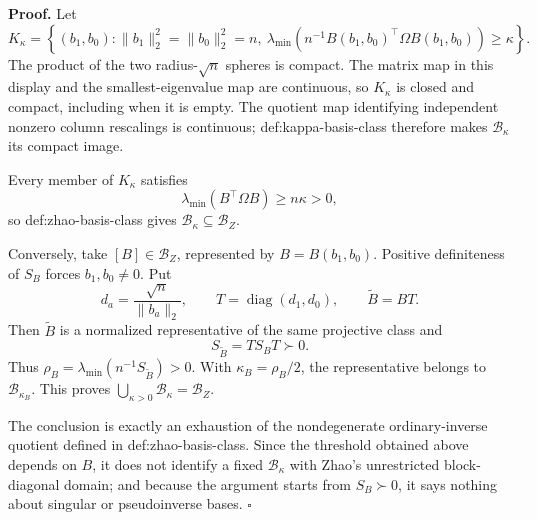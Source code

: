 \textbf{Proof.}
Let
\[
K_\kappa=\left\{(b_1,b_0):
\lVert b_1\rVert_2^2=\lVert b_0\rVert_2^2=n,
\ \lambda_{\min}\!\left(n^{-1}B(b_1,b_0)^{\top}\Omega B(b_1,b_0)\right)\ge\kappa
\right\}.
\]
The product of the two radius-\(\sqrt n\) spheres is compact.  The matrix map in this display and the smallest-eigenvalue map are continuous, so \(K_\kappa\) is closed and compact, including when it is empty.  The quotient map identifying independent nonzero column rescalings is continuous; def:kappa-basis-class therefore makes \(\mathcal B_\kappa\) its compact image.

Every member of \(K_\kappa\) satisfies
\[
\lambda_{\min}(B^{\top}\Omega B)\ge n\kappa>0,
\]
so def:zhao-basis-class gives \(\mathcal B_\kappa\subseteq\mathcal B_Z\).

Conversely, take \([B]\in\mathcal B_Z\), represented by \(B=B(b_1,b_0)\).  Positive definiteness of \(S_B\) forces \(b_1,b_0\ne0\).  Put
\[
d_a=\frac{\sqrt n}{\lVert b_a\rVert_2},
\qquad T=\operatorname{diag}(d_1,d_0),
\qquad \widetilde B=BT.
\]
Then \(\widetilde B\) is a normalized representative of the same projective class and
\[
S_{\widetilde B}=T S_BT\succ0.
\]
Thus \(\rho_B=\lambda_{\min}(n^{-1}S_{\widetilde B})>0\).  With \(\kappa_B=\rho_B/2\), the representative belongs to \(\mathcal B_{\kappa_B}\).  This proves \(\bigcup_{\kappa>0}\mathcal B_\kappa=\mathcal B_Z\).

The conclusion is exactly an exhaustion of the nondegenerate ordinary-inverse quotient defined in def:zhao-basis-class.  Since the threshold obtained above depends on \(B\), it does not identify a fixed \(\mathcal B_\kappa\) with Zhao's unrestricted block-diagonal domain; and because the argument starts from \(S_B\succ0\), it says nothing about singular or pseudoinverse bases. \(\square\)